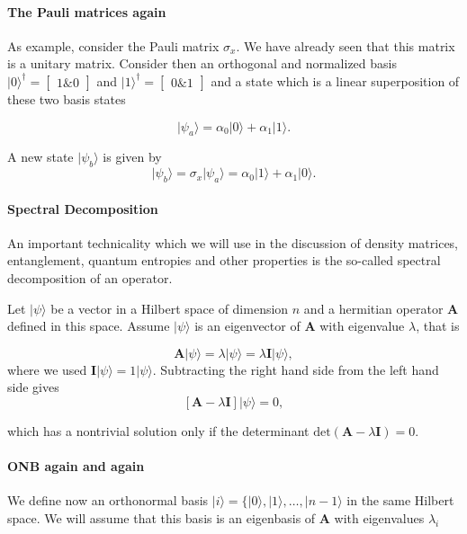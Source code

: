 \paragraph{The Pauli matrices again}

As example, consider the Pauli matrix $\sigma_x$. We have already seen that this matrix is a unitary matrix. Consider then an orthogonal and normalized basis $\vert 0\rangle^{\dagger} =\begin{bmatrix} 1 {\&} 0\end{bmatrix}$ and $\vert 1\rangle^{\dagger} =\begin{bmatrix} 0 {\&} 1\end{bmatrix}$ and a state which is a linear superposition of these two basis states

\[
\vert \psi_a\rangle=\alpha_0\vert 0\rangle +\alpha_1\vert 1\rangle.
\]

A new state $\vert \psi_b\rangle$ is given by
\[
\vert \psi_b\rangle=\sigma_x\vert \psi_a\rangle=\alpha_0\vert 1\rangle +\alpha_1\vert 0\rangle.
\]


\paragraph{Spectral Decomposition}

An important technicality which we will use in the discussion of
density matrices, entanglement, quantum entropies and other properties
is the so-called spectral decomposition of an operator.

Let $\vert \psi\rangle$ be a vector in a Hilbert space of dimension $n$ and a hermitian operator $\bm{A}$ defined in this
space. Assume $\vert \psi\rangle$ is an eigenvector of $\bm{A}$ with eigenvalue $\lambda$, that is

\[
\bm{A}\vert \psi\rangle = \lambda\vert \psi\rangle = \lambda \bm{I}\vert \psi \rangle,
\]
where we used $\bm{I}\vert \psi \rangle = 1 \vert \psi \rangle$.
Subtracting the right hand side from the left hand side gives
\[
\left[\bm{A}-\lambda \bm{I}\right]\vert \psi \rangle=0,
\]

which has a nontrivial solution only if the determinant
$\mathrm{det}(\bm{A}-\lambda\bm{I})=0$.


\paragraph{ONB again and again}

We define now an orthonormal basis $\vert i \rangle =\{\vert 0
\rangle, \vert 1\rangle, \dots, \vert n-1\rangle$ in the same Hilbert
space. We will assume that this basis is an eigenbasis of $\bm{A}$ with eigenvalues $\lambda_i$

